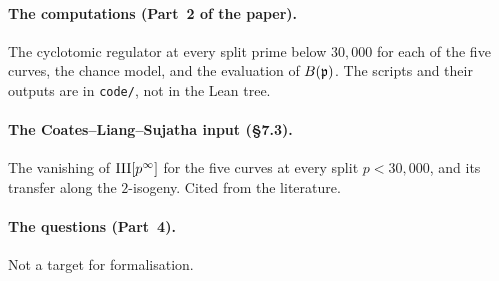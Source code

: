 \paragraph{The computations (Part~2 of the paper).} The cyclotomic
regulator at every split prime below $30{,}000$ for each of the five
curves, the chance model, and the evaluation of $B({\mathfrak{p}})$. The scripts and
their outputs are in \texttt{code/}, not in the Lean tree.

\paragraph{The Coates--Liang--Sujatha input (\S 7.3).} The vanishing of
$\mathrm{III}[p^\infty]$ for the five curves at every split $p < 30{,}000$, and its
transfer along the $2$-isogeny. Cited from the literature.

\paragraph{The questions (Part~4).} Not a target for formalisation.
